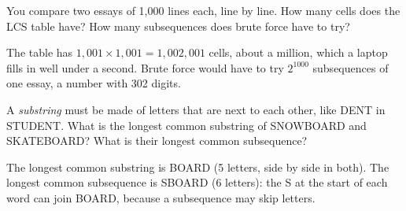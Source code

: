 \begin{Exercise}[title={How Big Is the Table?}, label=dp_size]
You compare two essays of 1,000 lines each, line by line. How many cells does the LCS table have? How many
subsequences does brute force have to try?
\end{Exercise}
\begin{Answer}[ref=dp_size]
The table has $1{,}001 \times 1{,}001 = 1{,}002{,}001$ cells, about a million, which a laptop fills in well under
a second. Brute force would have to try $2^{1000}$ subsequences of one essay, a number with 302 digits.
\end{Answer}

\begin{Exercise}[title={Substring or Subsequence?}, label=dp_substring]
A \emph{substring} must be made of letters that are next to each other, like DENT in STUDENT. What is the
longest common substring of SNOWBOARD and SKATEBOARD? What is their longest common subsequence?
\end{Exercise}
\begin{Answer}[ref=dp_substring]
The longest common substring is BOARD (5 letters, side by side in both). The longest common subsequence is
SBOARD (6 letters): the S at the start of each word can join BOARD, because a subsequence may skip letters.
\end{Answer}
